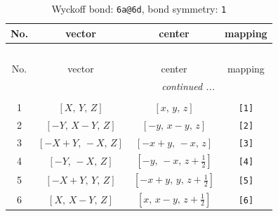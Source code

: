 \documentclass[fleqn,8pt]{jsarticle}
\begin{document}
\begin{longtable}{cccc}
\caption{Wyckoff bond: {\tt 6a@6d}, bond symmetry: {\tt 1}}
 \\
 \hline \hline
No. & vector & center & mapping \\ \hline \endfirsthead

\multicolumn{3}{l}{\tablename\ \thetable{}} \\
 \hline \hline
No. & vector & center & mapping \\ \hline \endhead

 \hline \hline
\multicolumn{3}{r}{\footnotesize\it continued ...} \\ \endfoot

 \hline \hline
\multicolumn{3}{r}{} \\ \endlastfoot

1 & $\left[ X,\, Y,\, Z \right]$ & $\left[ x,\, y,\, z \right]$ & {\tt [1]} \\ \hline
2 & $\left[ - Y,\, X - Y,\, Z \right]$ & $\left[ - y,\, x - y,\, z \right]$ & {\tt [2]} \\ \hline
3 & $\left[ - X + Y,\, - X,\, Z \right]$ & $\left[ - x + y,\, - x,\, z \right]$ & {\tt [3]} \\ \hline
4 & $\left[ - Y,\, - X,\, Z \right]$ & $\left[ - y,\, - x,\, z + \frac{1}{2} \right]$ & {\tt [4]} \\ \hline
5 & $\left[ - X + Y,\, Y,\, Z \right]$ & $\left[ - x + y,\, y,\, z + \frac{1}{2} \right]$ & {\tt [5]} \\ \hline
6 & $\left[ X,\, X - Y,\, Z \right]$ & $\left[ x,\, x - y,\, z + \frac{1}{2} \right]$ & {\tt [6]} \\
\end{longtable}
\end{document}
